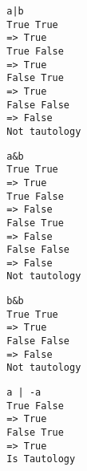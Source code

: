 \begin{multicols}{2}
    \begin{verbatim}
        a|b
        True True
        => True
        True False
        => True
        False True
        => True
        False False
        => False
        Not tautology       
    \end{verbatim}
    \columnbreak

    \begin{verbatim}  
        a&b
        True True
        => True
        True False
        => False
        False True
        => False
        False False
        => False
        Not tautology
    \end{verbatim}
    \columnbreak

    \begin{verbatim}  
        b&b
        True True
        => True
        False False
        => False
        Not tautology
    \end{verbatim}
    \columnbreak

    \begin{verbatim}  
        a | -a
        True False
        => True
        False True
        => True
        Is Tautology
    \end{verbatim}
\end{multicols}

